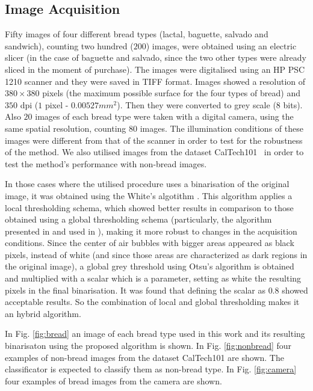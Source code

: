 \documentclass[oneside,a4paper,english,links]{amca}
\begin{document}
\subsection{Image Acquisition}
Fifty images of four different bread types (lactal, baguette, salvado and sandwich), counting two hundred ($200$) images, were obtained using an electric slicer (in the case of baguette and salvado, since the two other types were already sliced in the moment of purchase). The images were digitalised using an HP PSC 1210 scanner and they were saved in TIFF format. Images showed a resolution of $380 \times 380$ pixels (the maximum possible surface for the four types of bread) and $350$ dpi ($1$ pixel - $0.00527 mm^{2}$). Then they were converted to grey scale ($8$ bits). Also $20$ images of each bread type were taken with a digital camera, using the same spatial resolution, counting $80$ images. The illumination conditions of these images were different from that of the scanner in order to test for the robustness of the method. We also utilised images from the dataset CalTech101~\cite{FeiFei04} in order to test the method's performance with non-bread images. 

In those cases where the utilised procedure uses a binarisation of the original image, it was obtained using the White's algotithm \cite{White83}. This algorithm applies a local thresholding schema, which showed better results in comparison to those obtained using a global thresholding schema (particularly, the algorithm presented in \cite{Huang95} and used in \cite{Gonzales2008}), making it more robust to changes in the acquisition conditions. Since the center of air bubbles with bigger areas appeared as black pixels, instead of white (and since those areas are characterized as dark regions in the original image), a global grey threshold using Otsu's algorithm \cite{Otsu79} is obtained and multiplied with a scalar which is a parameter, setting as white the resulting pixels in the final binarisation. It was found that defining the scalar as $0.8$ showed acceptable results. So the combination of local and global thresholding makes it an hybrid algorithm.

In Fig. \ref{fig:bread} an image of each bread type used in this work and its resulting binarisaton using the proposed algorithm is shown. In Fig. \ref{fig:nonbread} four examples of non-bread images from the dataset CalTech101 are shown. The classificator is expected to classify them as non-bread type. In Fig. \ref{fig:camera} four examples of bread images from the camera are shown.
\end{document}
